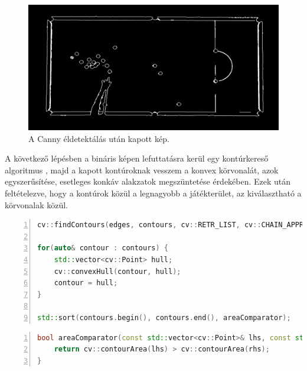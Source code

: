 \begin{figure}[!ht]
    \centering
    \includegraphics[width=140mm, keepaspectratio]{figures/input_screen_edge.png}
    \caption{A Canny éldetektálás után kapott kép.}
    \label{fig:bemeneti_kep_edge}
\end{figure}

\par A következő lépésben a bináris képen lefuttatásra kerül egy kontúrkereső algoritmus \cite{SUZUKI198532}, majd a kapott kontúroknak vesszem a konvex körvonalát, azok egyszerűsítése, esetleges konkáv alakzatok megszüntetése érdekében. Ezek után feltételezve, hogy a kontúrok közül a legnagyobb a játékterület, az kiválasztható a körvonalak közül.

\begin{codewrapper}
\begin{lstlisting}[language=C++, numbers=left, caption={Kontúrok keresése.}, label={cod:contours}]
cv::findContours(edges, contours, cv::RETR_LIST, cv::CHAIN_APPROX_SIMPLE);

for(auto& contour : contours) {
    std::vector<cv::Point> hull;
    cv::convexHull(contour, hull);
    contour = hull;
}

std::sort(contours.begin(), contours.end(), areaComparator);
\end{lstlisting}
\end{codewrapper}

\begin{codewrapper}
\begin{lstlisting}[language=C++, numbers=left, caption={Sorba rendezéshez használt segédfüggvény.}, label={cod:contours_helper}]
bool areaComparator(const std::vector<cv::Point>& lhs, const std::vector<cv::Point>& rhs) {
    return cv::contourArea(lhs) > cv::contourArea(rhs);
}
\end{lstlisting}
\end{codewrapper}

